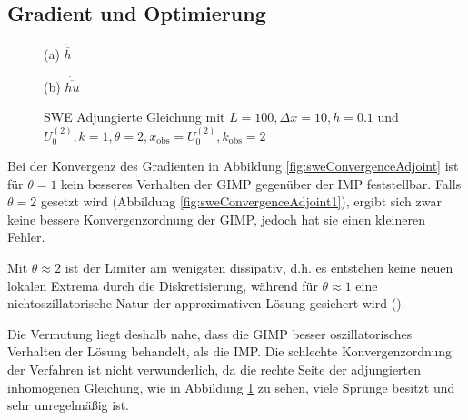 \subsection{Gradient und Optimierung}
\begin{figure}[H]
\footnotesize
\begin{minipage}[b]{0.49\linewidth}
\centering

\caption*{(a) $\dot{\overline{h}}$}
\end{minipage}
\begin{minipage}[b]{0.49\linewidth}
\centering

\caption*{(b) $\dot{\overline{hu}}$}
\end{minipage}
\caption{SWE Adjungierte Gleichung mit $L=100,\Delta x=10,h = 0.1$ und $U_0^{(2)},k=1,\theta=2,x_{\text{obs}}=U_0^{(2)},k_{\text{obs}}=2$}
\label{fig:sweAdjointEqRHS}
\end{figure}
Bei der Konvergenz des Gradienten in Abbildung \ref{fig:sweConvergenceAdjoint} ist für $\theta=1$ kein besseres Verhalten der GIMP gegenüber der IMP feststellbar. Falls $\theta=2$ gesetzt wird (Abbildung \ref{fig:sweConvergenceAdjoint1}), ergibt sich zwar keine bessere Konvergenzordnung der GIMP, jedoch hat sie einen kleineren Fehler. 

Mit $\theta\approx 2$ ist der Limiter am wenigsten dissipativ, d.h. es entstehen keine neuen lokalen Extrema durch die Diskretisierung, während für $\theta\approx 1$ eine nichtoszillatorische Natur der approximativen Lösung gesichert wird (\cite[Abschnitt 6]{kurganov2000new}).

Die Vermutung liegt deshalb nahe, dass die GIMP besser oszillatorisches Verhalten der Lösung behandelt, als die IMP.
Die schlechte Konvergenzordnung der Verfahren ist nicht verwunderlich, da die rechte Seite der adjungierten inhomogenen Gleichung, wie in Abbildung \ref{fig:sweAdjointEqRHS} zu sehen, viele Sprünge besitzt und sehr unregelmäßig ist.

